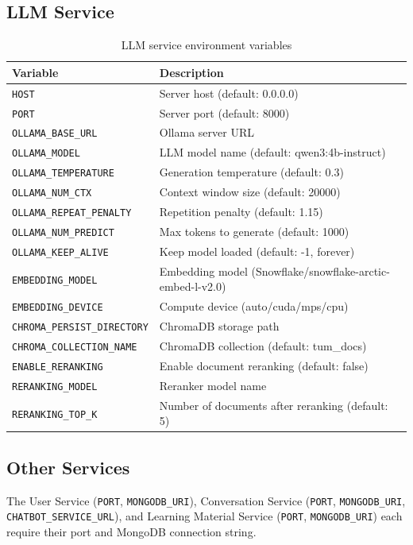 \documentclass[a4paper,12pt]{report}
\begin{document}
\subsection{LLM Service}
\begin{table}[H]
\centering
\begin{tabularx}{\textwidth}{lX}
    \toprule
    \textbf{Variable} & \textbf{Description} \\
    \midrule
    \texttt{HOST} & Server host (default: 0.0.0.0) \\
    \texttt{PORT} & Server port (default: 8000) \\
    \texttt{OLLAMA\_BASE\_URL} & Ollama server URL \\
    \texttt{OLLAMA\_MODEL} & LLM model name (default: qwen3:4b-instruct) \\
    \texttt{OLLAMA\_TEMPERATURE} & Generation temperature (default: 0.3) \\
    \texttt{OLLAMA\_NUM\_CTX} & Context window size (default: 20000) \\
    \texttt{OLLAMA\_REPEAT\_PENALTY} & Repetition penalty (default: 1.15) \\
    \texttt{OLLAMA\_NUM\_PREDICT} & Max tokens to generate (default: 1000) \\
    \texttt{OLLAMA\_KEEP\_ALIVE} & Keep model loaded (default: -1, forever) \\
    \texttt{EMBEDDING\_MODEL} & Embedding model (Snowflake/snowflake-arctic-embed-l-v2.0) \\
    \texttt{EMBEDDING\_DEVICE} & Compute device (auto/cuda/mps/cpu) \\
    \texttt{CHROMA\_PERSIST\_DIRECTORY} & ChromaDB storage path \\
    \texttt{CHROMA\_COLLECTION\_NAME} & ChromaDB collection (default: tum\_docs) \\
    \texttt{ENABLE\_RERANKING} & Enable document reranking (default: false) \\
    \texttt{RERANKING\_MODEL} & Reranker model name \\
    \texttt{RERANKING\_TOP\_K} & Number of documents after reranking (default: 5) \\
    \bottomrule
\end{tabularx}
\caption{LLM service environment variables}
\end{table}

\subsection{Other Services}
The User Service (\texttt{PORT}, \texttt{MONGODB\_URI}), Conversation Service (\texttt{PORT}, \texttt{MONGODB\_URI}, \texttt{CHATBOT\_SERVICE\_URL}), and Learning Material Service (\texttt{PORT}, \texttt{MONGODB\_URI}) each require their port and MongoDB connection string.
\end{document}
